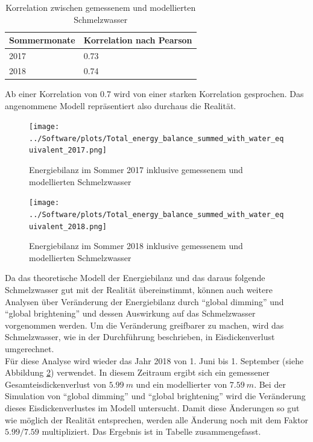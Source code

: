 \documentclass[12pt,a4paper]{article}
\begin{document}
\begin{table}[H]
\centering
{} 
\caption{Korrelation zwischen gemessenem und modellierten Schmelzwasser}
\label{tab:Korrelation zwischen gemessenem und modellierten Schmelzwasser}
\begin{tabular}{|l|l|}
\hline
Sommermonate & Korrelation nach Pearson \\ \hline
2017         & 0.73                     \\ \hline
2018         & 0.74                     \\ \hline
\end{tabular}
\end{table}

Ab einer Korrelation von 0.7 wird von einer starken Korrelation gesprochen. Das angenommene Modell repräsentiert also durchaus die Realität.

\begin{figure}[H]
\centering
\texttt{[image: ../Software/plots/Total\_energy\_balance\_summed\_with\_water\_equivalent\_2017.png]}
\caption{Energiebilanz im Sommer 2017 inklusive gemessenem und modellierten Schmelzwasser}
\label{fig:Energiebilanz im Sommer 2017 inklusive gemessenem und modellierten Schmelzwasser}
\end{figure}

\begin{figure}[H]
\centering
\texttt{[image: ../Software/plots/Total\_energy\_balance\_summed\_with\_water\_equivalent\_2018.png]}
\caption{Energiebilanz im Sommer 2018 inklusive gemessenem und modellierten Schmelzwasser}
\label{fig:Energiebilanz im Sommer 2018 inklusive gemessenem und modellierten Schmelzwasser}
\end{figure}

Da das theoretische Modell der Energiebilanz und das daraus folgende Schmelzwasser gut mit der Realität übereinstimmt, können auch weitere Analysen über Veränderung der Energiebilanz durch ``global dimming'' und ``global brightening'' und dessen Auswirkung auf das Schmelzwasser vorgenommen werden. Um die Veränderung greifbarer zu machen, wird das Schmelzwasser, wie in der Durchführung beschrieben, in Eisdickenverlust umgerechnet.\\

Für diese Analyse wird wieder das Jahr 2018 von 1. Juni bis 1. September (siehe Abbildung \ref{fig:Energiebilanz im Sommer 2018 inklusive gemessenem und modellierten Schmelzwasser}) verwendet. In diesem Zeitraum ergibt sich ein gemessener Gesamteisdickenverlust von $5.99~m$ und ein modellierter von $7.59~m$. Bei der Simulation von ``global dimming'' und ``global brightening'' wird die Veränderung dieses Eisdickenverlustes im Modell untersucht. Damit diese Änderungen so gut wie möglich der Realität entsprechen, werden alle Änderung noch mit dem Faktor $5.99/7.59$ multipliziert. Das Ergebnis ist in Tabelle zusammengefasst.
\end{document}
